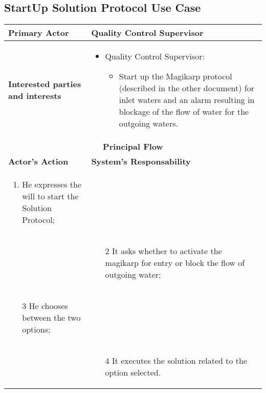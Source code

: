 \subsection{StartUp Solution Protocol Use Case}

\begin{longtable}{|p{7cm}|p{7cm}|}

\hline
\textbf{Primary Actor} & Quality Control Supervisor
\\


\hline
\textbf{Interested parties and interests} &
\begin{itemize}
\item Quality Control Supervisor:
	\begin{itemize}
 	\item Start up the Magikarp protocol (described in the other document) for inlet waters and an alarm resulting in blockage of the flow of water for the outgoing waters.
	\end{itemize}
\end{itemize}
\\


\hline
\multicolumn{2}{|c|}{\textbf{Principal Flow}} \\

\hline
\textbf{Actor's Action} & \textbf{System's Responsability}\\

\hline

\begin{enumerate}
\item He expresses the will to start the Solution Protocol;
\end{enumerate} &\\

& 
\begin{enumerate}
\item[2]It asks whether to activate the magikarp for entry or block the flow of outgoing water;
\end{enumerate}\\

\begin{enumerate}
\item[3]He chooses between the two options;			
\end{enumerate} &\\


& 
\begin{enumerate}
\item[4]It executes the solution related to the option selected.
\end{enumerate}\\

\hline
\end{longtable}

